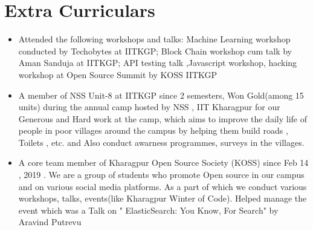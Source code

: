 \documentclass[letterpaper,11pt]{article}
\newcommand{\resumeSubHeadingListStart}{\begin{itemize}[leftmargin=*]}
\newcommand{\resumeSubHeadingListEnd}{\end{itemize}}
\begin{document}
\section{Extra Curriculars}
  \resumeSubHeadingListStart
    \item{
      {Attended the following workshops and talks}{: Machine Learning workshop conducted by Techobytes at IITKGP; Block Chain workshop cum talk by Aman Sanduja at IITKGP; API testing talk ,Javascript workshop, hacking workshop at Open Source Summit by KOSS IITKGP }
      \hfill
    }
    \item{
      {A member of NSS Unit-8 at IITKGP since 2 semesters, Won Gold(among 15 units) during the annual camp hosted by NSS , IIT Kharagpur for our Generous and Hard work at the camp, which aims to improve the daily life of people in poor villages around the campus by helping them build  roads , Toilets , etc. and Also conduct awarness programmes, surveys in the villages. }
      \hfill
    }
    \item{
      {A core team member of Kharagpur Open Source Society (KOSS) since Feb 14 , 2019 . We are a group of students who promote Open source in our campus and on various social media platforms. As a part of which we conduct various workshops, talks, events(like Kharagpur Winter of Code). 
      Helped manage the event which  was a Talk on " ElasticSearch: You Know, For Search" by Aravind Putrevu }
      \hfill
    }

  \resumeSubHeadingListEnd
\end{document}
